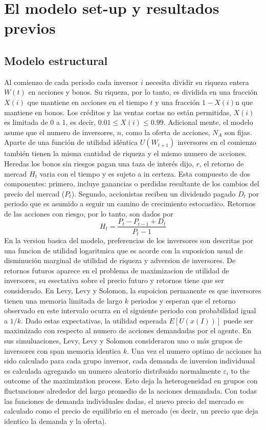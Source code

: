 \documentclass[12pt,a4paper]{article}
\begin{document}
\section*{El modelo set-up y resultados previos}
\subsection*{Modelo estructural}
\quad Al comienzo de cada periodo cada inversor $i$ necesita dividir su riqueza entera $W(t)$ en acciones y bonos. Su riqueza, por lo tanto, es dividida en una fracción $X(i)$ que mantiene en acciones en el tiempo $t$ y una fracción $1-X(i)$n que mantiene en bonos. Los créditos y las ventas cortas no están permitidas, $X(i)$ es limitada de 0 a 1, es decir, $0.01\leq X(i)\leq 0.99$. Adicional mente, el modelo asume que el numero de inversores, $n$, como la oferta de acciones, $N_A$ son fijas. Aparte de una función de utilidad idéntica $U(W_{t+1})$ inversores en el comienzo también tienen la misma cantidad de riqueza y el mismo numero de acciones. Heredas los bonos sin riesgos pagan una taza de interés dijo, $r$, el retorno de mercad $H_t$ varia con el tiempo y es sujeto a in certeza. Esta compuesto de dos componentes: primero, incluye ganancias o perdidas resultante de los cambios del precio del mercad ($P_t$). Segundo, accionistas reciben un dividendo pagado $D_t$ por periodo que es asumido a seguir un camino de crecimiento estocastico. Retornos de las acciones con riesgo, por lo tanto, son dados por
\begin{equation}
H_t=\frac{P_t-P_{t-1}+D_t}{P_t-1}
\end{equation}
\quad En la version basica del modelo, preferencias de los inversores son descritas por una funcion de utilidad logaritmica que es acorde con la suposicion usual de disminución marginal de utilidad de riqueza y adversion de inversores. De retornos futuros aparece en el problema de maximizacion de utilidad de inversores, su esectativa sobre el precio futuro y retornos tiene que ser considerado. En Levy, Levy y Solomon, la supoicion permanente es que inversores tienen una memoria limitada de largo $k$ periodos y esperan que el retorno observado en este intervalo ocurra en el siguiente periodo con probabilidad igual a $1/k$. Dado estas expectativas, la utilidad esperada $E[U(x(I))] $ puede ser maximizado con respecto al numero de acciones demandadas por el agente. En sus simuluaciones, Levy, Levy y Solomon consideraron uno o más grupos de inversores con span memoria identica $k$. Una vez el numero  optimo de  acciones ha sido calculado para cada grupo inversor, cada demanda de inversion individuual es calculada agregando un numero aleatorio distribuido normalmente $\varepsilon_i$ to the outcome of the maximization process. Esto deja la heterogeneidad en grupos con fluctuaciones alrededor del largo promedio de la acciones demandada. Con todas las funciones de demanda individuales dadas, el nuevo precio del mercado es calculado como el precio de equilibrio en el mercado (es decir, un precio que deja identico la demanda y la oferta).
\end{document}
